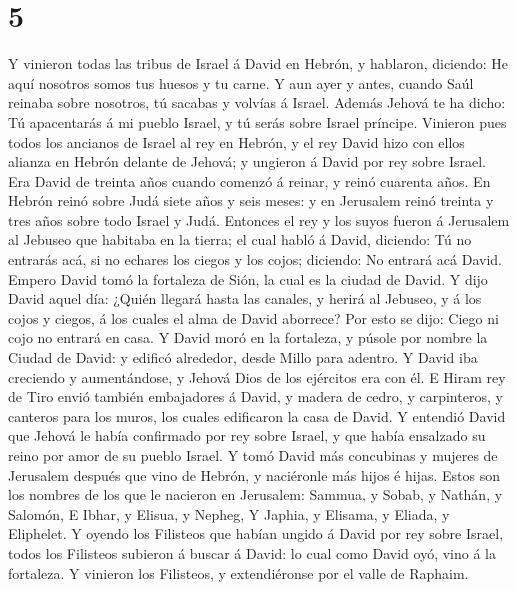 \hypertarget{section-4}{%
\section{5}\label{section-4}}

 Y vinieron todas las tribus de Israel á David en Hebrón, y
hablaron, diciendo: He aquí nosotros somos tus huesos y tu carne.
 Y aun ayer y antes, cuando Saúl reinaba sobre nosotros, tú
sacabas y volvías á Israel. Además Jehová te ha dicho: Tú apacentarás á
mi pueblo Israel, y tú serás sobre Israel príncipe. 
Vinieron pues todos los ancianos de Israel al rey en Hebrón, y el rey
David hizo con ellos alianza en Hebrón delante de Jehová; y ungieron á
David por rey sobre Israel.  Era David de treinta años
cuando comenzó á reinar, y reinó cuarenta años.  En Hebrón
reinó sobre Judá siete años y seis meses: y en Jerusalem reinó treinta y
tres años sobre todo Israel y Judá.  Entonces el rey y los
suyos fueron á Jerusalem al Jebuseo que habitaba en la tierra; el cual
habló á David, diciendo: Tú no entrarás acá, si no echares los ciegos y
los cojos; diciendo: No entrará acá David.  Empero David
tomó la fortaleza de Sión, la cual es la ciudad de David.  Y
dijo David aquel día: ¿Quién llegará hasta las canales, y herirá al
Jebuseo, y á los cojos y ciegos, á los cuales el alma de David aborrece?
Por esto se dijo: Ciego ni cojo no entrará en casa.  Y David
moró en la fortaleza, y púsole por nombre la Ciudad de David: y edificó
alrededor, desde Millo para adentro.  Y David iba creciendo
y aumentándose, y Jehová Dios de los ejércitos era con él. 
E Hiram rey de Tiro envió también embajadores á David, y madera de
cedro, y carpinteros, y canteros para los muros, los cuales edificaron
la casa de David.  Y entendió David que Jehová le había
confirmado por rey sobre Israel, y que había ensalzado su reino por amor
de su pueblo Israel.  Y tomó David más concubinas y mujeres
de Jerusalem después que vino de Hebrón, y naciéronle más hijos é hijas.
 Estos son los nombres de los que le nacieron en Jerusalem:
Sammua, y Sobab, y Nathán, y Salomón,  E Ibhar, y Elisua, y
Nepheg,  Y Japhia, y Elisama, y Eliada, y Eliphelet.
 Y oyendo los Filisteos que habían ungido á David por rey
sobre Israel, todos los Filisteos subieron á buscar á David: lo cual
como David oyó, vino á la fortaleza.  Y vinieron los
Filisteos, y extendiéronse por el valle de Raphaim. 
